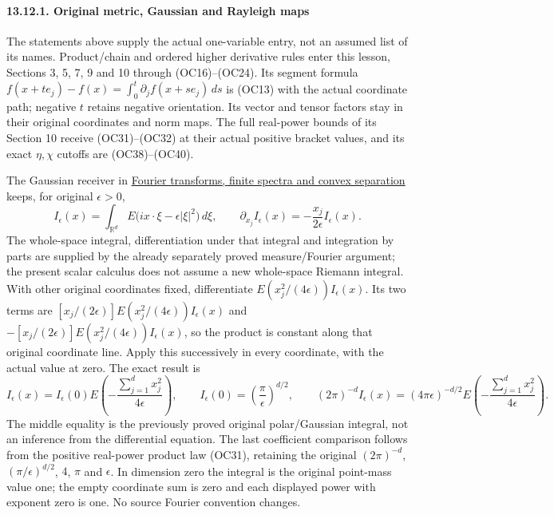 \documentclass[
  11pt,
]{article}
\begin{document}
\paragraph{13.12.1. Original metric, Gaussian and Rayleigh
maps}\label{original-metric-gaussian-and-rayleigh-maps}

The statements above supply the actual one-variable entry, not an
assumed list of its names. Product/chain and ordered higher derivative
rules enter this lesson, Sections 3, 5, 7, 9 and 10 through
(OC16)--(OC24). Its segment formula
\(f(x+t e_j)-f(x)=\int_0^t\partial_jf(x+s e_j)\,ds\) is (OC13) with the
actual coordinate path; negative \(t\) retains negative orientation. Its
vector and tensor factors stay in their original coordinates and norm
maps. The full real-power bounds of its Section 10 receive
(OC31)--(OC32) at their actual positive bracket values, and its exact
\(\eta,\chi\) cutoffs are (OC38)--(OC40).

The Gaussian receiver in \href{prerequisite-bridges.pdf}{Fourier
transforms, finite spectra and convex separation} keeps, for original
\(\epsilon>0\), \[
 I_\epsilon(x)=\int_{\mathbb R^d}
      E\bigl(i x\cdot\xi-\epsilon|\xi|^2\bigr)\,d\xi,\qquad
 \partial_{x_j}I_\epsilon(x)=-\frac{x_j}{2\epsilon}I_\epsilon(x).
\tag{OC47}
\] The whole-space integral, differentiation under that integral and
integration by parts are supplied by the already separately proved
measure/Fourier argument; the present scalar calculus does not assume a
new whole-space Riemann integral. With other original coordinates fixed,
differentiate \(E(x_j^2/(4\epsilon))I_\epsilon(x)\). Its two terms are
\([x_j/(2\epsilon)]E(x_j^2/(4\epsilon))I_\epsilon(x)\) and
\(-[x_j/(2\epsilon)]E(x_j^2/(4\epsilon))I_\epsilon(x)\), so the product
is constant along that original coordinate line. Apply this successively
in every coordinate, with the actual value at zero. The exact result is
\[
 I_\epsilon(x)
 =I_\epsilon(0)E\left(-\frac{\sum_{j=1}^d x_j^2}{4\epsilon}\right),
 \qquad
 I_\epsilon(0)=\left(\frac{\pi}{\epsilon}\right)^{d/2},
 \qquad
 (2\pi)^{-d}I_\epsilon(x)
 =(4\pi\epsilon)^{-d/2}
      E\left(-\frac{\sum_{j=1}^d x_j^2}{4\epsilon}\right).
\tag{OC48}
\] The middle equality is the previously proved original polar/Gaussian
integral, not an inference from the differential equation. The last
coefficient comparison follows from the positive real-power product law
(OC31), retaining the original \((2\pi)^{-d}\),
\((\pi/\epsilon)^{d/2}\), \(4\), \(\pi\) and \(\epsilon\). In dimension
zero the integral is the original point-mass value one; the empty
coordinate sum is zero and each displayed power with exponent zero is
one. No source Fourier convention changes.
\end{document}
